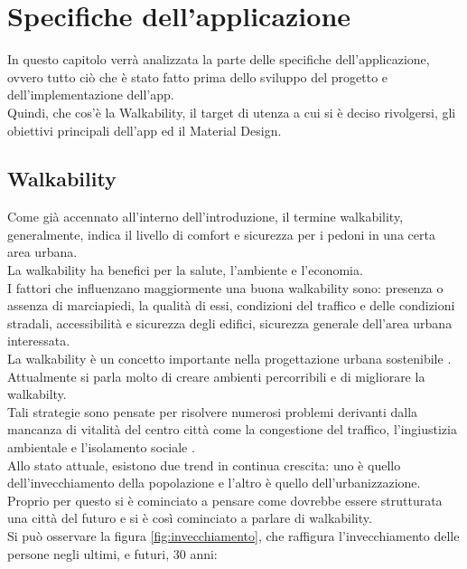 \chapter{Specifiche dell'applicazione}
\label{chapter1}
In questo capitolo verrà analizzata la parte delle specifiche dell'applicazione, ovvero tutto ciò che è stato fatto prima dello sviluppo del progetto e dell'implementazione dell'app.
\\Quindi, che cos'è la Walkability, il target di utenza a cui si è deciso rivolgersi, gli obiettivi principali dell'app ed il Material Design.


\section{Walkability}
Come già accennato all'interno dell'introduzione, il termine walkability, generalmente, indica il livello di comfort e sicurezza per i pedoni in una certa area urbana.
\\La walkability ha benefici per la salute, l'ambiente e l'economia. 
\\I fattori che influenzano maggiormente una buona walkability sono: presenza o assenza di marciapiedi, la qualità di essi, condizioni del traffico e delle condizioni stradali, accessibilità e sicurezza degli edifici, sicurezza generale dell'area urbana interessata.
\\La walkability è un concetto importante nella progettazione urbana sostenibile \cite{walkability}.
\\Attualmente si parla molto di creare ambienti percorribili e di migliorare la walkabilty.
\\Tali strategie sono pensate per risolvere numerosi problemi derivanti dalla mancanza di vitalità del centro città come la congestione del traffico, l'ingiustizia ambientale e l'isolamento sociale \cite{walkable}.
\\Allo stato attuale, esistono due trend in continua crescita: uno è quello dell’invecchiamento della popolazione e l’altro è quello dell’urbanizzazione.
\\Proprio per questo si è cominciato a pensare come dovrebbe essere strutturata una città del futuro e si è così cominciato a parlare di walkability.
\\Si può osservare la figura \ref{fig:invecchiamento}, che raffigura l'invecchiamento delle persone negli ultimi, e futuri, 30 anni:
\pagebreak
